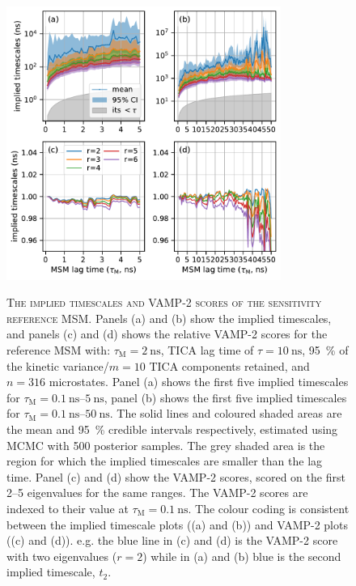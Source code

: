 \begin{figure}[ht!]
 \centering
    \caption[The implied timescales and VAMP-2 scores of the sensitivity reference MSM]{\textsc{The implied timescales and VAMP-2 scores of the sensitivity reference MSM}. Panels (a) and (b) show the implied timescales, and panels (c) and (d) shows the relative VAMP-2 scores for the reference MSM with: $\tau_{\mathrm{M}}=\SI{2}{\nano\second}$, TICA lag time of $\tau=\SI{10}{\nano\second}$, \SI{95}{\percent} of the kinetic variance/$m=10$ TICA components retained, and $n=316$ microstates. Panel (a) shows the first five implied timescales for $\tau_{\mathrm{M}}=\SIrange[range-phrase=\text{--}]{0.1}{5}{\nano\second}$, panel (b) shows the first five implied timescales for $\tau_{\mathrm{M}} = \SIrange[range-phrase]{0.1}{50}{\nano\second}$. The solid lines and coloured shaded areas are the mean and \SI{95}{\percent} credible intervals respectively, estimated using MCMC with \num{500} posterior samples. The grey shaded area is the region for which the implied timescales are smaller than the lag time. Panel (c) and (d) show the VAMP-2 scores, scored on the first \numrange{2}{5} eigenvalues for the same ranges. The VAMP-2 scores are indexed to their value at $\tau_{\mathrm{M}}=\SI{0.1}{\nano\second}$. The colour coding is consistent between the implied timescale plots ((a) and (b)) and VAMP-2 plots ((c) and (d)). e.g. the blue line in (c) and (d) is the VAMP-2 score with two eigenvalues ($r=2$) while in (a) and (b) blue is the second implied timescale, $t_{2}$.}
 \includegraphics[width=0.8\textwidth]{chapters/aadh/figures/implied_timescales_D_sens.pdf}
 \label{fig:its_d_sens}
\end{figure}

